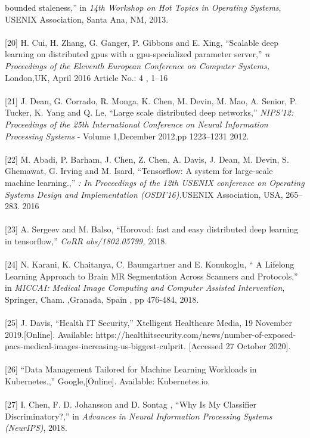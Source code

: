bounded staleness,'' in \emph{14th Workshop on Hot Topics in Operating
Systems}, USENIX Association, Santa Ana, NM, 2013. \\\\{[}20{]} H. Cui, H. Zhang, G. Ganger, P.
Gibbons and E. Xing, ``Scalable deep learning on distributed gpus with a
gpu-specialized parameter server,'' \emph{n Proceedings of the Eleventh
European Conference on Computer Systems,} London,UK, April 2016 Article No.: 4 , 1–16 \\\\{[}21{]}
J. Dean, G. Corrado, R. Monga, K. Chen, M. Devin, M. Mao, A. Senior, P.
Tucker, K. Yang and Q. Le, ``Large scale distributed deep networks,''
\emph{NIPS'12: Proceedings of the 25th International Conference on Neural Information Processing Systems} - Volume 1,December 2012,pp 1223–1231
2012. \\\\{[}22{]} M. Abadi, P. Barham, J. Chen, Z. Chen, A. Davis, J. Dean,
M. Devin, S. Ghemawat, G. Irving and M. Isard, ``Tensorflow: A system
for large-scale machine learning.,'' \emph{: In Proceedings of the 12th USENIX conference on Operating Systems Design and Implementation (OSDI'16).}USENIX Association, USA, 265–283. 2016
\\\\{[}23{]} A. Sergeev and M. Balso, ``Horovod: fast and easy distributed
deep learning in tensorflow,'' \emph{CoRR abs/1802.05799,} 2018.
\\\\{[}24{]} N. Karani, K. Chaitanya, C. Baumgartner and E. Konukoglu, `` A
Lifelong Learning Approach to Brain MR Segmentation Across Scanners and
Protocols,'' in \emph{MICCAI: Medical Image Computing and Computer
Assisted Intervention}, Springer, Cham. ,Granada, Spain , pp 476-484, 2018. \\\\{[}25{]} J. Davis, ``Health IT Security,''
Xtelligent Healthcare Media, 19 November 2019.{[}Online{]}. Available:
https://healthitsecurity.com/news/number-of-exposed-pacs-medical-images-increasing-us-biggest-culprit.
{[}Accessed 27 October 2020{]}.\\\\{[}26{]} ``Data Management Tailored for
Machine Learning Workloads in Kubernetes.,'' Google,{[}Online{]}.
Available: Kubernetes.io.\\\\{[}27{]} I. Chen, F. D. Johansson and D. Sontag
, ``Why Is My Classifier Discriminatory?,'' in \emph{Advances in Neural
Information Processing Systems (NeurIPS)}, 2018.



